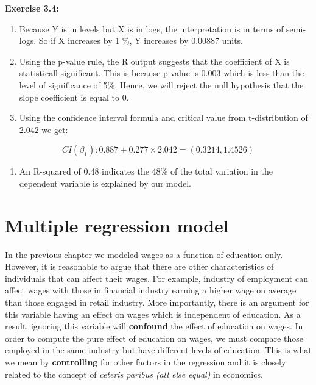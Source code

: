 \documentclass[
]{book}
\providecommand{\tightlist}{%
  \setlength{\itemsep}{0pt}\setlength{\parskip}{0pt}}
\theoremstyle{definition}
\theoremstyle{definition}
\theoremstyle{definition}
\theoremstyle{definition}
\theoremstyle{remark}
\begin{document}
\textbf{Exercise 3.4:}

\begin{enumerate}
\def\labelenumi{\alph{enumi}.}
\item
  Because Y is in levels but X is in logs, the interpretation is in terms of semi-logs. So if X increases by 1 \%, Y increases by 0.00887 units.
\item
  Using the p-value rule, the R output suggests that the coefficient of X is statisticall significant. This is because p-value is 0.003 which is less than the level of significance of 5\%. Hence, we will reject the null hypothesis that the slope coefficient is equal to 0.
\item
  Using the confidence interval formula and critical value from t-distribution of 2.042 we get:
\end{enumerate}

\[CI(\beta_1): 0.887 \pm 0.277 \times 2.042=(0.3214,1.4526)\]

\begin{enumerate}
\def\labelenumi{\alph{enumi}.}
\setcounter{enumi}{3}
\tightlist
\item
  An R-squared of 0.48 indicates the 48\% of the total variation in the dependent variable is explained by our model.
\end{enumerate}

\hypertarget{multiple-regression-model}{%
\chapter{Multiple regression model}\label{multiple-regression-model}}

In the previous chapter we modeled wages as a function of education only. However, it is reasonable to argue that there are other characteristics of individuals that can affect their wages. For example, industry of employment can affect wages with those in financial industry earning a higher wage on average than those engaged in retail industry. More importantly, there is an argument for this variable having an effect on wages which is independent of education. As a result, ignoring this variable will \textbf{confound} the effect of education on wages. In order to compute the pure effect of education on wages, we must compare those employed in the same industry but have different levels of education. This is what we mean by \textbf{controlling} for other factors in the regression and it is closely related to the concept of \emph{ceteris paribus (all else equal)} in economics.
\end{document}
